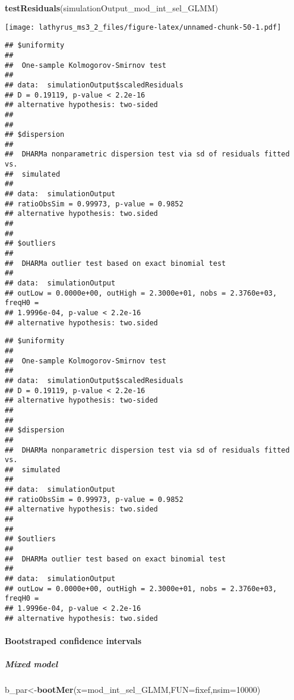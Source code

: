 \documentclass[
]{article}
\newenvironment{Shaded}{\begin{snugshade}}{\end{snugshade}}
\newcommand{\DataTypeTok}[1]{\textcolor[rgb]{0.13,0.29,0.53}{#1}}
\newcommand{\DecValTok}[1]{\textcolor[rgb]{0.00,0.00,0.81}{#1}}
\newcommand{\KeywordTok}[1]{\textcolor[rgb]{0.13,0.29,0.53}{\textbf{#1}}}
\newcommand{\NormalTok}[1]{#1}
\begin{document}
\begin{Shaded}
\begin{Highlighting}[]
\KeywordTok{testResiduals}\NormalTok{(simulationOutput_mod_int_sel_GLMM)}
\end{Highlighting}
\end{Shaded}

\texttt{[image: lathyrus\_ms3\_2\_files/figure-latex/unnamed-chunk-50-1.pdf]}

\begin{verbatim}
## $uniformity
## 
##  One-sample Kolmogorov-Smirnov test
## 
## data:  simulationOutput$scaledResiduals
## D = 0.19119, p-value < 2.2e-16
## alternative hypothesis: two-sided
## 
## 
## $dispersion
## 
##  DHARMa nonparametric dispersion test via sd of residuals fitted vs.
##  simulated
## 
## data:  simulationOutput
## ratioObsSim = 0.99973, p-value = 0.9852
## alternative hypothesis: two.sided
## 
## 
## $outliers
## 
##  DHARMa outlier test based on exact binomial test
## 
## data:  simulationOutput
## outLow = 0.0000e+00, outHigh = 2.3000e+01, nobs = 2.3760e+03, freqH0 =
## 1.9996e-04, p-value < 2.2e-16
## alternative hypothesis: two.sided
\end{verbatim}

\begin{verbatim}
## $uniformity
## 
##  One-sample Kolmogorov-Smirnov test
## 
## data:  simulationOutput$scaledResiduals
## D = 0.19119, p-value < 2.2e-16
## alternative hypothesis: two-sided
## 
## 
## $dispersion
## 
##  DHARMa nonparametric dispersion test via sd of residuals fitted vs.
##  simulated
## 
## data:  simulationOutput
## ratioObsSim = 0.99973, p-value = 0.9852
## alternative hypothesis: two.sided
## 
## 
## $outliers
## 
##  DHARMa outlier test based on exact binomial test
## 
## data:  simulationOutput
## outLow = 0.0000e+00, outHigh = 2.3000e+01, nobs = 2.3760e+03, freqH0 =
## 1.9996e-04, p-value < 2.2e-16
## alternative hypothesis: two.sided
\end{verbatim}

\hypertarget{bootstraped-confidence-intervals}{%
\paragraph{Bootstraped confidence
intervals}\label{bootstraped-confidence-intervals}}

\hypertarget{mixed-model}{%
\subparagraph{Mixed model}\label{mixed-model}}

\begin{Shaded}
\begin{Highlighting}[]
\NormalTok{b_par<-}\KeywordTok{bootMer}\NormalTok{(}\DataTypeTok{x=}\NormalTok{mod_int_sel_GLMM,}\DataTypeTok{FUN=}\NormalTok{fixef,}\DataTypeTok{nsim=}\DecValTok{10000}\NormalTok{)}
\end{Highlighting}
\end{Shaded}
\end{document}
